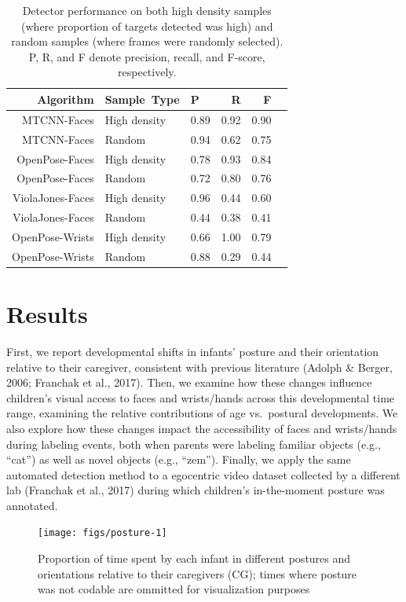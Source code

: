 \documentclass[english,man,floatsintext]{apa6}
\begin{document}
\begin{table}[ht]
\centering
\begin{tabular}{rllrrr}
\hline
Algorithm & Sample\ Type & P & R & F \\ 
\hline
MTCNN-Faces & High density & 0.89 & 0.92 & 0.90 \\ 
MTCNN-Faces & Random & 0.94 & 0.62 & 0.75 \\ 
OpenPose-Faces & High density & 0.78 & 0.93 & 0.84 \\ 
OpenPose-Faces & Random & 0.72 & 0.80 & 0.76 \\ 
ViolaJones-Faces & High density & 0.96 & 0.44 & 0.60 \\ 
ViolaJones-Faces & Random & 0.44 & 0.38 & 0.41 \\ 
OpenPose-Wrists & High density & 0.66 & 1.00 & 0.79 \\ 
OpenPose-Wrists & Random & 0.88 & 0.29 & 0.44 \\ 
\hline
\end{tabular}
\caption{Detector performance on both high density samples (where proportion of targets detected was high) and random samples (where frames were randomly selected). P, R, and F denote precision, recall, and F-score, respectively.} 
\vspace{-1em}
\end{table}

\section{Results}\label{results}

First, we report developmental shifts in infants' posture and their
orientation relative to their caregiver, consistent with previous
literature (Adolph \& Berger, 2006; Franchak et al., 2017). Then, we
examine how these changes influence children's visual access to faces
and wrists/hands across this developmental time range, examining the
relative contributions of age vs.~postural developments. We also explore
how these changes impact the accessibility of faces and wrists/hands
during labeling events, both when parents were labeling familiar objects
(e.g., \enquote{cat}) as well as novel objects (e.g., \enquote{zem}).
Finally, we apply the same automated detection method to a egocentric
video dataset collected by a different lab (Franchak et al., 2017)
during which children's in-the-moment posture was annotated.

\begin{figure}[!h]

{\centering \texttt{[image: figs/posture-1]} 

}

\caption{Proportion of time spent by each infant in different postures and orientations relative to their caregivers (CG); times where posture was not codable are ommitted for visualization purposes}\label{fig:posture}
\end{figure}
\end{document}

